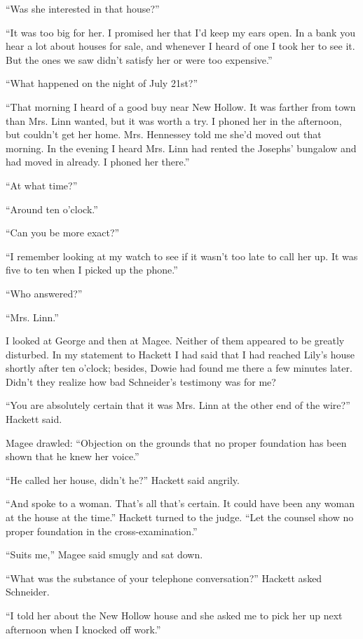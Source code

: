\documentclass{novel}
\begin{document}
{“Was she interested in that house?”

“It was too big for her. I promised her that I’d keep my ears open. In a bank you hear a lot about houses for sale, and whenever I heard of one I took her to see it. But the ones we saw didn’t satisfy her or were too expensive.”

“What happened on the night of July 21st?”

“That morning I heard of a good buy near New Hollow. It was farther from town than Mrs. Linn wanted, but it was worth a try. I phoned her in the afternoon, but couldn’t get her home. Mrs. Hennessey told me she’d moved out that morning. In the evening I heard Mrs. Linn had rented the Josephs’ bungalow and had moved in already. I phoned her there.”

“At what time?”

“Around ten o’clock.”

“Can you be more exact?”

“I remember looking at my watch to see if it wasn’t too late to call her up. It was five to ten when I picked up the phone.”

“Who answered?”

“Mrs. Linn.”

I looked at George and then at Magee. Neither of them appeared to be greatly disturbed. In my statement to Hackett I had said that I had reached Lily’s house shortly after ten o’clock; besides, Dowie had found me there a few minutes later. Didn’t they realize how bad Schneider’s testimony was for me?

“You are absolutely certain that it was Mrs. Linn at the other end of the wire?” Hackett said.

Magee drawled: “Objection on the grounds that no proper foundation has been shown that he knew her voice.”

“He called her house, didn’t he?” Hackett said angrily.

“And spoke to a woman. That’s all that’s certain. It could have been any woman at the house at the time.” Hackett turned to the judge. “Let the counsel show no proper foundation in the cross-examination.”

“Suits me,” Magee said smugly and sat down.

“What was the substance of your telephone conversation?” Hackett asked Schneider.

“I told her about the New Hollow house and she asked me to pick her up next afternoon when I knocked off work.”

}
\end{document}
